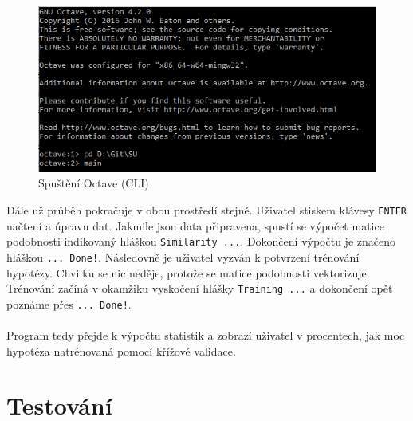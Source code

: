 \documentclass[a4]{article}
\begin{document}
\begin{figure}[!ht]
	\centering
		\includegraphics[width=\textwidth]{images/runWithoutGUI}
	\caption{Spuštění Octave (CLI)}
	\label{fig:runWithoutGUI}
\end{figure}

Dále už průběh pokračuje v obou prostředí stejně. Uživatel stiskem klávesy \texttt{ENTER} načtení a úpravu dat. Jakmile jsou data připravena, spustí se výpočet matice podobnosti indikovaný hláškou \texttt{Similarity ...}. Dokončení výpočtu je značeno hláškou \texttt{... Done!}. Následovně je uživatel vyzván k potvrzení trénování hypotézy. Chvilku se nic neděje, protože se matice podobnosti vektorizuje. Trénování začíná v okamžiku vyskočení hlášky \texttt{Training ...} a dokončení opět poznáme přes \texttt{... Done!}.
\\\\
Program tedy přejde k výpočtu statistik a zobrazí uživatel v procentech, jak moc hypotéza natrénovaná pomocí křížové validace.

\section{Testování}
\end{document}
